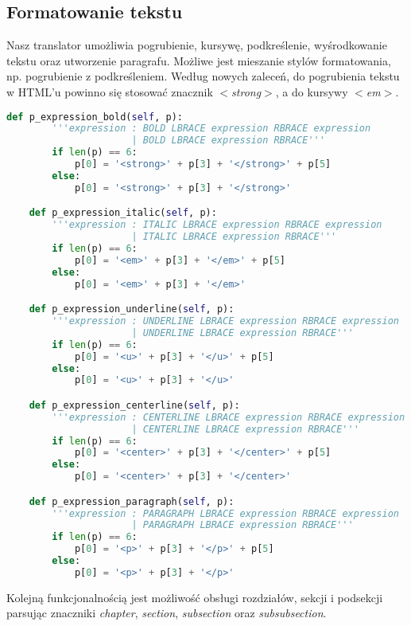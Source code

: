 \subsection{Formatowanie tekstu}

Nasz translator umożliwia pogrubienie, kursywę, podkreślenie, wyśrodkowanie tekstu oraz utworzenie paragrafu. 
Możliwe jest mieszanie stylów formatowania, np. pogrubienie z podkreśleniem. 
Według nowych zaleceń, do pogrubienia tekstu w HTML'u powinno się stosować znacznik
\textit{$<$strong$>$}, a do kursywy \textit{$<$em$>$}.

\begin{lstlisting}[language={Python}, caption={Formatowanie - pogrubienie, kursywa, podkreślenie, wyśrodkowanie tekstu}, label={gramatyka-pogrubienie-kursywa}]
    def p_expression_bold(self, p):
        '''expression : BOLD LBRACE expression RBRACE expression
                      | BOLD LBRACE expression RBRACE'''
        if len(p) == 6:
            p[0] = '<strong>' + p[3] + '</strong>' + p[5]
        else:
            p[0] = '<strong>' + p[3] + '</strong>'

    def p_expression_italic(self, p):
        '''expression : ITALIC LBRACE expression RBRACE expression
                      | ITALIC LBRACE expression RBRACE'''
        if len(p) == 6:
            p[0] = '<em>' + p[3] + '</em>' + p[5]
        else:
            p[0] = '<em>' + p[3] + '</em>'

    def p_expression_underline(self, p):
        '''expression : UNDERLINE LBRACE expression RBRACE expression
                      | UNDERLINE LBRACE expression RBRACE'''
        if len(p) == 6:
            p[0] = '<u>' + p[3] + '</u>' + p[5]
        else:
            p[0] = '<u>' + p[3] + '</u>'

    def p_expression_centerline(self, p):
        '''expression : CENTERLINE LBRACE expression RBRACE expression
                      | CENTERLINE LBRACE expression RBRACE'''
        if len(p) == 6:
            p[0] = '<center>' + p[3] + '</center>' + p[5]
        else:
            p[0] = '<center>' + p[3] + '</center>'

    def p_expression_paragraph(self, p):
        '''expression : PARAGRAPH LBRACE expression RBRACE expression
                      | PARAGRAPH LBRACE expression RBRACE'''
        if len(p) == 6:
            p[0] = '<p>' + p[3] + '</p>' + p[5]
        else:
            p[0] = '<p>' + p[3] + '</p>'
\end{lstlisting}

Kolejną funkcjonalnością jest możliwość obsługi rozdziałów, sekcji i podsekcji parsując 
znaczniki \textit{chapter}, \textit{section}, \textit{subsection} oraz \textit{subsubsection}.

